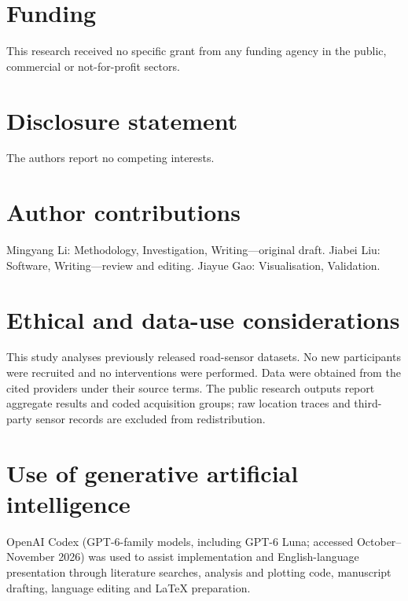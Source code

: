 \section*{Funding}
This research received no specific grant from any funding agency in the public, commercial or not-for-profit sectors.

\section*{Disclosure statement}
The authors report no competing interests.

\ifanonymous\else
\section*{Author contributions}
Mingyang Li: Methodology, Investigation, Writing---original draft. Jiabei Liu: Software, Writing---review and editing. Jiayue Gao: Visualisation, Validation.
\fi

\section*{Ethical and data-use considerations}
This study analyses previously released road-sensor datasets. No new participants were recruited and no interventions were performed. Data were obtained from the cited providers under their source terms. The public research outputs report aggregate results and coded acquisition groups; raw location traces and third-party sensor records are excluded from redistribution.

\section*{Use of generative artificial intelligence}
OpenAI Codex (GPT-6-family models, including GPT-6 Luna; accessed October--November 2026) was used to assist implementation and English-language presentation through literature searches, analysis and plotting code, manuscript drafting, language editing and LaTeX preparation.

